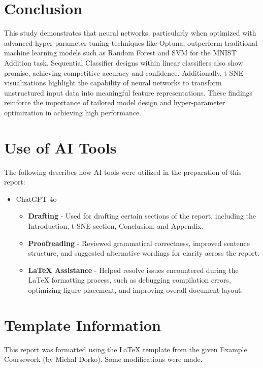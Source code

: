 \documentclass{article}
\begin{document}
\section{Conclusion}
This study demonstrates that neural networks, particularly when optimized with advanced hyper-parameter tuning techniques like Optuna, outperform traditional machine learning models such as Random Forest and SVM for the MNIST Addition task. Sequential Classifier designs within linear classifiers also show promise, achieving competitive accuracy and confidence. Additionally, t-SNE visualizations highlight the capability of neural networks to transform unstructured input data into meaningful feature representations. These findings reinforce the importance of tailored model design and hyper-parameter optimization in achieving high performance.

\clearpage
\newpage
\appendix
\section{Use of AI Tools}
The following describes how AI tools were utilized in the preparation of this report:
\begin{itemize}
    \item ChatGPT 4o
        \begin{itemize}
            \item \textbf{Drafting} - Used for drafting certain sections of the report, including the Introduction, t-SNE section, Conclusion, and Appendix.
            \item \textbf{Proofreading} - Reviewed grammatical correctness, improved sentence structure, and suggested alternative wordings for clarity across the report.
            \item \textbf{LaTeX Assistance} - Helped resolve issues encountered during the LaTeX formatting process, such as debugging compilation errors, optimizing figure placement, and improving overall document layout.
        \end{itemize}
\end{itemize}

\section{Template Information}
This report was formatted using the LaTeX template from the given Example Coursework (by Michal Dorko). Some modifications were made.

\newpage
\printbibliography
\end{document}
